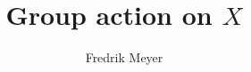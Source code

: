 \documentclass[11pt, english]{article}
\begin{document}
\title{Group action on $X$}
\author{Fredrik Meyer}
\maketitle
\end{document}

